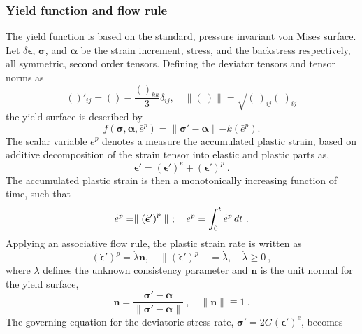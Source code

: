 \documentclass[11pt]{report}
\numberwithin{equation}{section}
\newcommand{\bmf } {\boldsymbol }
\begin{document}
\subsubsection {Yield function and flow rule}
\noindent The yield function is based on the standard, pressure invariant 
von Mises surface. Let $\delta\bmf{\epsilon}$, $\bmf{\sigma}$, 
and $\bmf{\alpha}$ be the strain increment, stress, and the backstress 
respectively, all symmetric, second order tensors. Defining the 
deviator tensors and tensor norms as
\begin{equation}\label{E:deviators_define}
(){'_{ij}} = () - \frac{{{{()}_{kk}}}}{3}{\delta _{ij}}, 
\quad  \parallel ( \ ) \parallel = \sqrt{ ( \ )_{ij}( \ )_{ij}}
\end{equation}
%
the yield surface is described by
\begin{equation}\label{E:ys_1}
f(\bmf{\sigma}, \bmf{\alpha}, \bar e^p)=
\parallel \bmf{\sigma}' -\bmf{\alpha} \parallel - k(\bar e^p).
\end{equation}
%
The scalar variable $\bar e^p$ denotes a measure the accumulated plastic strain, 
based on additive decomposition of the strain tensor into elastic and plastic parts as,
\begin{equation}
\bmf{\epsilon}'=(\bmf{\epsilon}')^e+(\bmf{\epsilon}')^p~.
\end{equation}
%
The accumulated plastic strain is then a monotonically increasing 
function of time, such that 
\begin{equation}\label{E:equiv_pl_strain}
\dot{\bar e}^p=\parallel \left( \dot{\bmf{\epsilon}}' \right) ^p \parallel~;
\quad \bar e^p = \int^t_0 \dot{\bar e}^p \thinspace dt~.
\end{equation}
%
Applying an associative flow rule, the plastic strain rate is written as
\begin{equation}
\left( \dot{\bmf{\epsilon}}' \right) ^p =
\dot{\lambda}\bmf{n}, \quad
\parallel \left( \dot{\bmf{\epsilon}}' \right) ^p \parallel = 
\dot{\lambda}, \quad \dot{\lambda} \geq 0~,
\end{equation}
%
where $\lambda$ defines the unknown consistency parameter 
and $\bmf{n}$ is the unit normal for the yield surface,
\begin{equation}\label{E:n_define}
\bmf{n}=\displaystyle \frac{\bmf{\sigma}'-
\bmf{\alpha}}{\parallel \bmf{\sigma}'-\bmf{\alpha} \parallel}~,
\quad \parallel \bmf{n} \parallel \equiv 1 ~.
\end{equation}
%
The governing equation for the deviatoric stress rate, $\dot{\bmf{\sigma}}'=
2G\left( \dot{\bmf{\epsilon}}'\right)^e$, becomes
\end{document}
